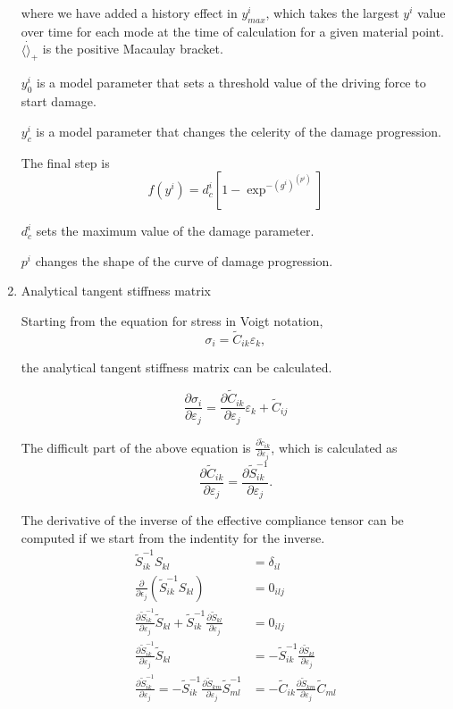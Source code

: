 \documentclass[11pt]{article}
\begin{document}
\begin{enumerate}
where we have added a history effect in \(y_{max}^i\), which 
takes the largest \(y^i\) value over time for each mode at the time of calculation
for a given material point.
\(\langle \dot \rangle_+\) is the positive
Macaulay bracket.

\(y_0^i\) is a model parameter that sets a threshold value of the
driving force to start damage.

\(y_c^i\) is a model parameter that changes the celerity of the damage
progression.

The final step is
\[
f(y^i) = d_c^i [1 - \exp^{-(g^i)^{(p^i)}}]
\]

\(d_c^i\) sets the maximum value of the damage parameter.

\(p^i\) changes the shape of the curve of damage progression.
\item Analytical tangent stiffness matrix
\label{sec:org1ec9315}

Starting from the equation for stress in Voigt notation,
\[
\sigma_i = \tilde{C}_{ik} \varepsilon_{k},
\]

the analytical tangent stiffness matrix can be calculated.

\[
\frac{\partial \sigma_i}{\partial \varepsilon_j} =
\frac{\partial \tilde{C}_{ik}}{\partial \varepsilon_j} \varepsilon_k +
\tilde{C}_{ij}
\]

The difficult part of the above equation is
\(\frac{\partial \tilde{c}_{ik}}{\partial \varepsilon_j}\), which is
calculated as
\[
\frac{\partial \tilde{C}_{ik}}{\partial \varepsilon_{j}} =
\frac{\partial \tilde{S}_{ik}^{-1}}{\partial \varepsilon_{j}}.
\]

The derivative of the inverse of the effective compliance tensor can
be computed if we start from the indentity for the inverse.
\begin{equation}
  \begin{split}
    \tilde{S}_{ik}^{-1} S_{kl} &= \delta_{il} \\
    \frac{\partial}{\partial \epsilon_{j}} (\tilde{S}_{ik}^{-1} S_{kl}) &= 0_{ilj} \\
    \frac{\partial \tilde{S}_{ik}^{-1}}{\partial \varepsilon_{j}} \tilde{S}_{kl} +
    \tilde{S}_{ik}^{-1} \frac{\partial \tilde{S}_{kl}}{\partial \varepsilon_{j}} &= 0_{ilj} \\
    \frac{\partial \tilde{S}_{ik}^{-1}}{\partial \varepsilon_{j}} \tilde{S}_{kl} &=
    -\tilde{S}_{ik}^{-1} \frac{\partial \tilde{S}_{kl}}{\partial \varepsilon_{j}} \\
    \frac{\partial \tilde{S}_{ik}^{-1}}{\partial \varepsilon_{j}} =
    -\tilde{S}_{ik}^{-1} \frac{\partial \tilde{S}_{km}}{\partial \varepsilon_{j}} \tilde{S}_{ml}^{-1} &=
    -\tilde{C}_{ik} \frac{\partial \tilde{S}_{km}}{\partial \varepsilon_{j}} \tilde{C}_{ml}
  \end{split}
\end{equation}


\end{enumerate}
\end{document}
